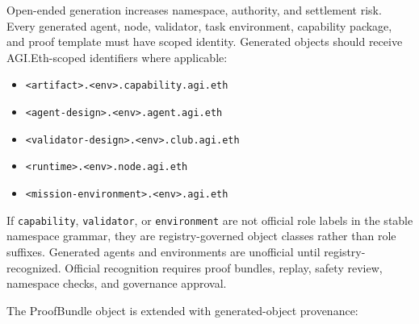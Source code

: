Open-ended generation increases namespace, authority, and settlement
risk. Every generated agent, node, validator, task environment,
capability package, and proof template must have scoped identity.
Generated objects should receive AGI.Eth-scoped identifiers where
applicable:

\begin{itemize}
\tightlist
\item
  \texttt{\textless{}artifact\textgreater{}.\textless{}env\textgreater{}.capability.agi.eth}
\item
  \texttt{\textless{}agent-design\textgreater{}.\textless{}env\textgreater{}.agent.agi.eth}
\item
  \texttt{\textless{}validator-design\textgreater{}.\textless{}env\textgreater{}.club.agi.eth}
\item
  \texttt{\textless{}runtime\textgreater{}.\textless{}env\textgreater{}.node.agi.eth}
\item
  \texttt{\textless{}mission-environment\textgreater{}.\textless{}env\textgreater{}.agi.eth}
\end{itemize}

If \texttt{capability}, \texttt{validator}, or \texttt{environment} are
not official role labels in the stable namespace grammar, they are
registry-governed object classes rather than role suffixes. Generated
agents and environments are unofficial until registry-recognized.
Official recognition requires proof bundles, replay, safety review,
namespace checks, and governance approval.

The ProofBundle object is extended with generated-object provenance:

\begin{Shaded}
\begin{Highlighting}[]
\FunctionTok{\{}
  \FunctionTok{:} \FunctionTok{\{}
    \FunctionTok{:} \FunctionTok{,}
    \FunctionTok{:} \FunctionTok{,}
    \FunctionTok{:} \FunctionTok{,}
    \FunctionTok{:} \OtherTok{[]}\FunctionTok{,}
    \FunctionTok{:} \FunctionTok{,}
    \FunctionTok{:} \FunctionTok{,}
    \FunctionTok{:} \FunctionTok{,}
    \FunctionTok{:} \FunctionTok{,}
    \FunctionTok{:} \FunctionTok{,}
    \FunctionTok{:} \OtherTok{[]}\FunctionTok{,}
    \FunctionTok{:} \FunctionTok{,}
    \FunctionTok{:} 
  \FunctionTok{\}}
\FunctionTok{\}}
\end{Highlighting}
\end{Shaded}


